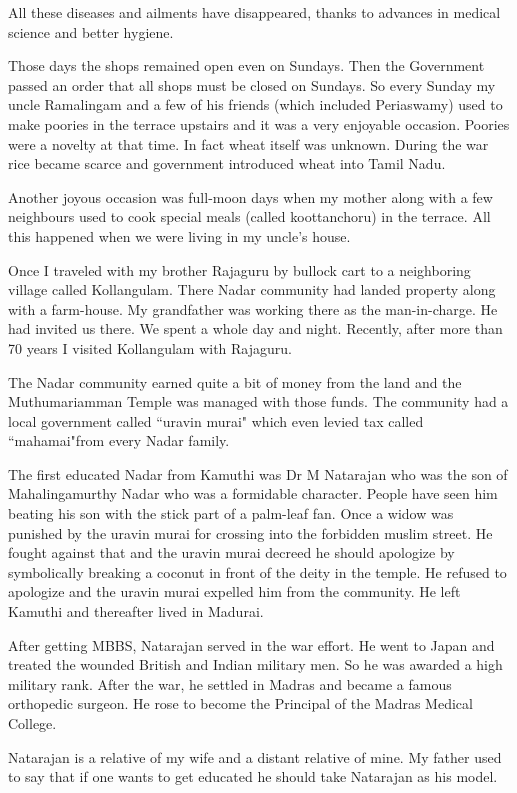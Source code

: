 All these diseases and ailments have disappeared, thanks to advances in 
medical science and better hygiene.
 
Those days the shops remained open even on Sundays. Then the Government 
passed an order that all shops must be closed on Sundays. So every 
Sunday my uncle Ramalingam and a few of his friends (which included 
Periaswamy) used to make poories in the terrace upstairs and it was a 
very enjoyable occasion. Poories were a novelty at that time. In fact 
wheat itself was unknown. During the war rice became scarce and 
government introduced wheat into Tamil Nadu.

Another joyous occasion was full-moon days when my mother along with a 
few neighbours used to cook special meals (called koottanchoru) in the 
terrace. All this happened when we were living in my uncle's house.
 
Once I traveled with my brother Rajaguru by bullock cart to a 
neighboring village called Kollangulam. There Nadar community had landed 
property along with a farm-house. My grandfather was working there as 
the man-in-charge. He had invited us there. We spent a whole day and 
night. Recently, after more than 70 years I visited Kollangulam with 
Rajaguru.

The Nadar community earned quite a bit of money from the land and the 
Muthumariamman Temple was managed with those funds. The community had a 
local government called ``uravin murai" which even levied tax called 
``mahamai"from every Nadar family.

The first educated Nadar from Kamuthi was Dr M Natarajan who was the son 
of Mahalingamurthy Nadar who was a formidable character. People have 
seen him beating his son with the stick part of a palm-leaf fan. Once a 
widow was punished by the uravin murai for crossing into the forbidden 
muslim street. He fought against that and the uravin murai decreed he 
should apologize by symbolically breaking a coconut in front of the 
deity in the temple. He refused to apologize and the uravin murai 
expelled him from the community. He left Kamuthi and thereafter lived in 
Madurai.

After getting MBBS, Natarajan served in the war effort. He went to Japan 
and treated the wounded British and Indian military men. So he was 
awarded a high military rank. After the war, he settled in Madras and 
became a famous orthopedic surgeon. He rose to become the Principal of 
the Madras Medical College.

Natarajan is a relative of my wife and a distant relative of mine. My 
father used to say that if one wants to get educated he should take 
Natarajan as his model.

